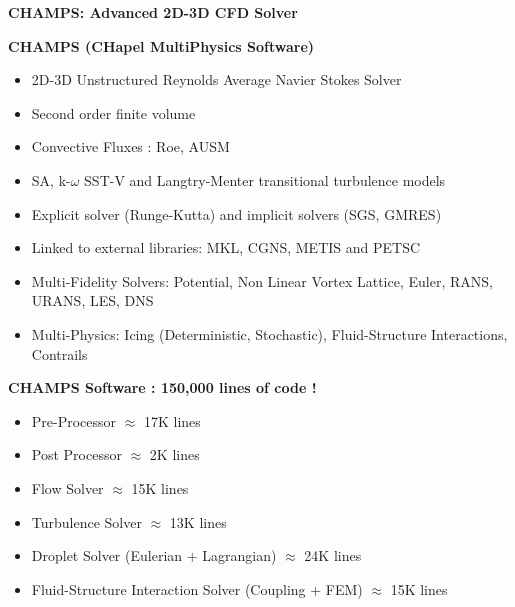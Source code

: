 \begin{frame}{\textbf{CHAMPS: Advanced 2D-3D CFD Solver}}
\scriptsize
\begin{block}{ \small \textbf{CHAMPS (CHapel MultiPhysics Software)}}
\begin{itemize}
\item 2D-3D Unstructured Reynolds Average Navier Stokes Solver
\item Second order finite volume 
\item Convective Fluxes : Roe, AUSM
\item SA, k-$\omega$ SST-V and Langtry-Menter transitional turbulence models
\item Explicit solver (Runge-Kutta) and implicit solvers (SGS, GMRES)
\item Linked to external libraries: MKL, CGNS, METIS and PETSC
\item Multi-Fidelity Solvers: Potential, Non Linear Vortex Lattice, Euler, RANS, URANS, LES, DNS
\item Multi-Physics: Icing (Deterministic, Stochastic), Fluid-Structure Interactions, Contrails
\end{itemize}
\end{block}

\begin{alertblock}{ \small \textbf{CHAMPS Software : 150,000 lines of code !}}
\begin{itemize}
    \item Pre-Processor $\approx$ 17K lines
    \item Post Processor $\approx$ 2K lines
    \item Flow Solver $\approx$ 15K lines
    \item Turbulence Solver $\approx$ 13K lines
    \item Droplet Solver (Eulerian + Lagrangian) $\approx$ 24K lines
    \item Fluid-Structure Interaction Solver (Coupling + FEM) $\approx$ 15K lines
    
    
\end{itemize}
\end{alertblock}
\end{frame}
